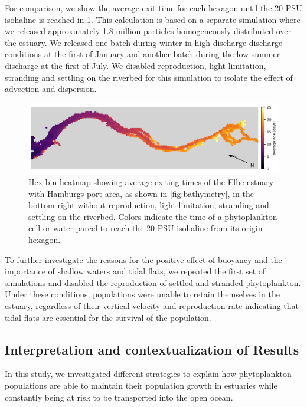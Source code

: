 \documentclass[npg, manuscript]{copernicus}
\begin{document}
For comparison, we show the average exit time for each hexagon until the 20 \unit{PSU} isohaline is reached in \ref{fig:flushing-heatmap}.
This calculation is based on a separate simulation where we released approximately 1.8 million particles homogeneously distributed over the estuary.
We released one batch during winter in high discharge discharge conditions at the first of January and another batch during the low summer discharge at the first of July.
We disabled reproduction, light-limitation, stranding and settling on the riverbed for this simulation to isolate the effect of advection and dispersion.
\begin{figure}
    \includegraphics[width=12cm]{flush_hexbin.png}
    \caption[]{
        Hex-bin heatmap showing average exiting times of the Elbe estuary with Hamburgs port area, as shown in \ref{fig:bathymetry}, in the bottom right without reproduction, light-limitation, stranding and settling on the riverbed.
        Colors indicate the time of a phytoplankton cell or water parcel to reach the 20 \unit{PSU} isohaline from its origin hexagon.
    }
    \label{fig:flushing-heatmap}
\end{figure}


To further investigate the reasons for the positive effect of buoyancy and the importance of shallow waters and tidal flats, we repeated the first set of simulations and disabled the reproduction of settled and stranded phytoplankton.
Under these conditions, populations were unable to retain themselves in the estuary, regardless of their vertical velocity and reproduction rate indicating that tidal flats are essential for the survival of the population.




\subsection{Interpretation and contextualization of Results}

In this study, we investigated different strategies to explain how phytoplankton populations are able to maintain their population growth in estuaries while constantly being at risk to be transported into the open ocean.
\end{document}
